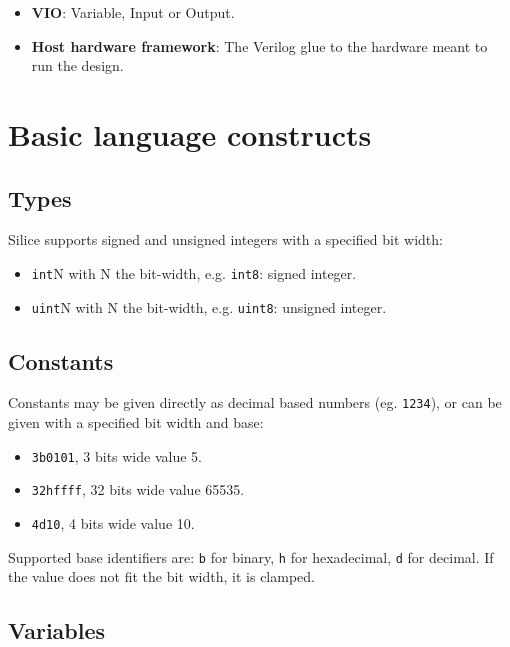 \documentclass[a4]{article}
\newcommand\verilog{Verilog}
\newcommand\silice{Silice}
\begin{document}
\begin{itemize}
\item \textbf{VIO}: Variable, Input or Output.
\item \textbf{Host hardware framework}: The \verilog{} glue to the hardware meant to run the design.
\end{itemize}


\section{Basic language constructs}

\subsection{Types}
\label{sec:types}

\silice{} supports signed and unsigned integers with a specified bit width:

\begin{itemize}
	\item \texttt{int}N with N the bit-width, e.g. \texttt{int8}: signed integer.
	\item \texttt{uint}N with N the bit-width, e.g. \texttt{uint8}: unsigned integer.
\end{itemize}

\subsection{Constants}
\label{sec:csts}

Constants may be given directly as decimal based numbers (eg. \texttt{1234}), or
can be given with a specified bit width and base:
\begin{itemize}
	\item \texttt{3b0101}, 3 bits wide value 5.
	\item \texttt{32hffff}, 32 bits wide value 65535.
	\item \texttt{4d10}, 4 bits wide value 10.
\end{itemize}

Supported base identifiers are: \texttt{b} for binary, \texttt{h} for hexadecimal, \texttt{d} for decimal. If the value does not fit the bit width, it is clamped.

\subsection{Variables}
\end{document}
